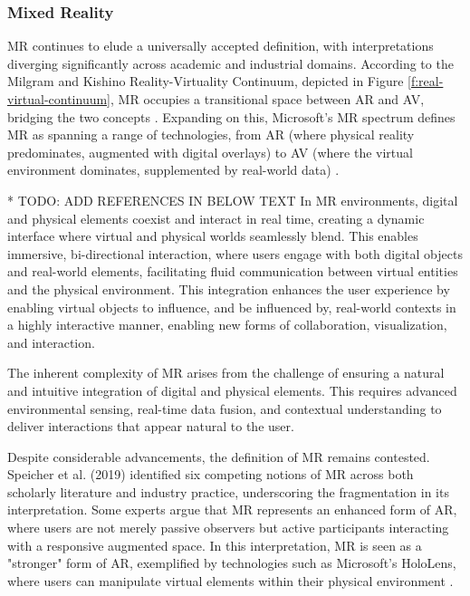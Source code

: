 \subsubsection{Mixed Reality}
   
    \ac{MR} continues to elude a universally accepted definition, with interpretations diverging significantly across academic and industrial domains. According to the Milgram and Kishino Reality-Virtuality Continuum, depicted in Figure \ref{f:real-virtual-continuum}, \ac{MR} occupies a transitional space between \ac{AR} and \ac{AV}, bridging the two concepts \cite{milgram1994}. Expanding on this, Microsoft’s \ac{MR} spectrum defines \ac{MR} as spanning a range of technologies, from \ac{AR} (where physical reality predominates, augmented with digital overlays) to \ac{AV} (where the virtual environment dominates, supplemented by real-world data) \cite{microsoft_mixed_reality}. 

    * TODO: ADD REFERENCES IN BELOW TEXT
    In \ac{MR} environments, digital and physical elements coexist and interact in real time, creating a dynamic interface where virtual and physical worlds seamlessly blend. This enables immersive, bi-directional interaction, where users engage with both digital objects and real-world elements, facilitating fluid communication between virtual entities and the physical environment. This integration enhances the user experience by enabling virtual objects to influence, and be influenced by, real-world contexts in a highly interactive manner, enabling new forms of collaboration, visualization, and interaction.

    The inherent complexity of \ac{MR} arises from the challenge of ensuring a natural and intuitive integration of digital and physical elements. This requires advanced environmental sensing, real-time data fusion, and contextual understanding to deliver interactions that appear natural to the user. 

    Despite considerable advancements, the definition of \ac{MR} remains contested. Speicher et al. (2019) identified six competing notions of \ac{MR} across both scholarly literature and industry practice, underscoring the fragmentation in its interpretation. Some experts argue that \ac{MR} represents an enhanced form of \ac{AR}, where users are not merely passive observers but active participants interacting with a responsive augmented space. In this interpretation, \ac{MR} is seen as a "stronger" form of \ac{AR}, exemplified by technologies such as Microsoft's HoloLens, where users can manipulate virtual elements within their physical environment \cite{whatismixedreality}.

